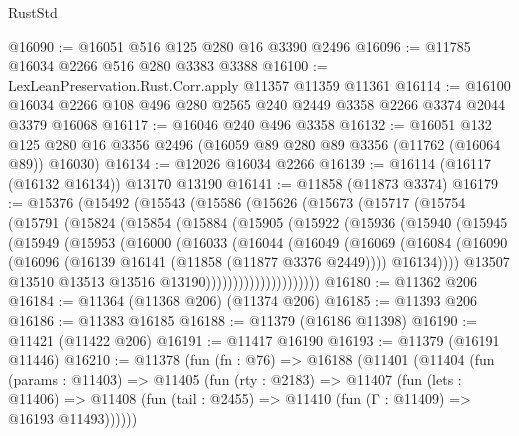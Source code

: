 \begin{lexlean}{RustStd}
\begin{coremodule}
@16090 := @16051 @516 @125 @280 @16 @3390 @2496
@16096 := @11785 @16034 @2266 @516 @280 @3383 @3388
@16100 := LexLeanPreservation.Rust.Corr.apply @11357 @11359 @11361
@16114 := @16100 @16034 @2266 @108 @496 @280 @2565 @240 @2449 @3358 @2266 @3374 @2044 @3379 @16068
@16117 := @16046 @240 @496 @3358
@16132 := @16051
    @132
    @125
    @280
    @16
    @3356
    @2496
    (@16059 @89 @280 @89 @3356 (@11762 (@16064 @89)) @16030)
@16134 := @12026 @16034 @2266
@16139 := @16114 (@16117 (@16132 @16134)) @13170 @13190
@16141 := @11858 (@11873 @3374)
@16179 := @15376
    (@15492
      (@15543
        (@15586
          (@15626
            (@15673
              (@15717
                (@15754
                  (@15791
                    (@15824
                      (@15854
                        (@15884
                          (@15905
                            (@15922
                              (@15936
                                (@15940
                                  (@15945
                                    (@15949
                                      (@15953
                                        (@16000
                                          (@16033
                                            (@16044
                                              (@16049
                                                (@16069
                                                  (@16084
                                                    (@16090
                                                      (@16096
                                                        (@16139
                                                          @16141
                                                          (@11858 (@11877 @3376 @2449))))
                                                      @16134))))
                                              @13507
                                              @13510
                                              @13513
                                              @13516
                                              @13190)))))))))))))))))))))
@16180 := @11362 @206
@16184 := @11364 (@11368 @206) (@11374 @206)
@16185 := @11393 @206
@16186 := @11383 @16185
@16188 := @11379 (@16186 @11398)
@16190 := @11421 (@11422 @206)
@16191 := @11417 @16190
@16193 := @11379 (@16191 @11446)
@16210 := @11378
    (fun (fn : @76) =>
    @16188
      (@11401
        (@11404
          (fun (params : @11403) =>
          @11405
            (fun (rty : @2183) =>
            @11407
              (fun (lets : @11406) =>
              @11408 (fun (tail : @2455) => @11410 (fun (Γ : @11409) => @16193 @11493))))))

\end{coremodule}
\end{lexlean}
